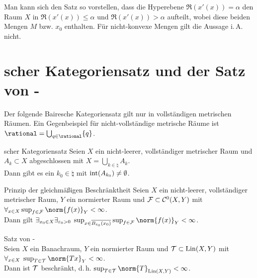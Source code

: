 \begin{Bem}
    Man kann sich den Satz so vorstellen, dass die Hyperebene $\Re(x'(x)) = \alpha$
    den Raum $X$ in $\Re(x'(x)) \le \alpha$ und $\Re(x'(x)) > \alpha$ aufteilt, wobei diese beiden
    Mengen $M$ bzw. $x_0$ enthalten.
    Für nicht-konvexe Mengen gilt die Aussage i.\,A. nicht.
\end{Bem}

\pagebreak

\section{%
    scher Kategoriensatz und der Satz von -%
}

\begin{Bem}
    Der folgende Bairesche Kategoriensatz gilt nur in vollständigen metrischen Räumen.
    Ein Gegenbeispiel für nicht-vollständige metrische Räume
    ist $\rational = \bigcup_{q \in \rational} \{q\}$.
\end{Bem}

\begin{Satz}{scher Kategoriensatz}
    Seien $X$ ein nicht-leerer, vollständiger metrischer Raum und $A_k \subset X$ abgeschlossen
    mit $X = \bigcup_{k \in \natural} A_k$.\\
    Dann gibt es ein $k_0 \in \natural$ mit $\operatorname{int}(A_{k_0}) \not= \emptyset$.
\end{Satz}

\begin{Satz}{Prinzip der gleichmäßigen Beschränktheit}
    Seien $X$ ein nicht-leerer, vollständiger metrischer Raum, $Y$ ein normierter Raum und
    $\mathcal{F} \subset \mathcal{C}^0(X, Y)$ mit $\forall_{x \in X} \sup_{f \in \F} \norm{f(x)}_Y < \infty$.\\
    Dann gilt $\exists_{x_0 \in X} \exists_{\varepsilon_0 > 0}\;
    \sup_{x \in \overline{B_{\varepsilon_0}(x_0)}} \sup_{f \in \F} \norm{f(x)}_Y < \infty$.
\end{Satz}

\begin{Satz}{Satz von -}\\
    Seien $X$ ein Banachraum, $Y$ ein normierter Raum und
    $\mathcal{T} \subset \operatorname{Lin}(X, Y)$ mit\\
    $\forall_{x \in X}\; \sup_{T \in \T} \norm{Tx}_Y < \infty$.\\
    Dann ist $\mathcal{T}$ beschränkt, d.\,h. $\sup_{T \in \T} \norm{T}_{\Lin(X, Y)} < \infty$.
\end{Satz}

